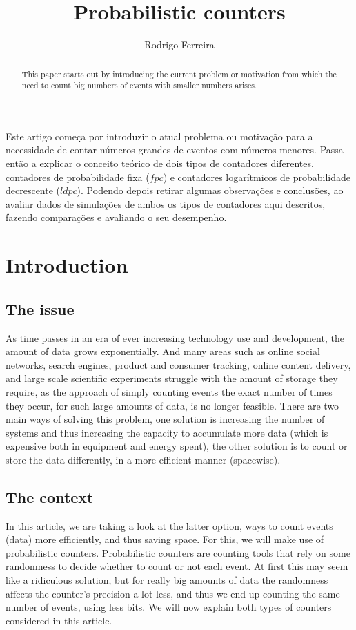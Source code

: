 \documentclass[...]{revdetua}
\begin{document}

\title{Probabilistic counters}
\author{Rodrigo Ferreira} %
\maketitle

\begin{resumo}%
	Este artigo começa por introduzir o  atual problema  ou motivação para a necessidade de contar números grandes de eventos com números menores.
	Passa então a explicar o conceito teórico de dois tipos de contadores diferentes, contadores de probabilidade fixa ($fpc$) e contadores logarítmicos de probabilidade decrescente ($ldpc$). 
	Podendo depois retirar algumas observações e conclusões, ao avaliar dados de simulações de ambos os tipos de contadores aqui descritos, fazendo comparações e avaliando o seu desempenho.
\end{resumo}

\begin{abstract}%
  This paper starts out by introducing the current problem or motivation from which the need to count big numbers of events with smaller numbers arises.
\end{abstract}
\section{Introduction}
\subsection{The issue}
As time passes in an era of ever increasing technology use and development, the amount of data grows exponentially. And many areas such as online social networks, search engines, product and consumer tracking, online content delivery, and  large scale scientific experiments struggle with the amount of storage they require, as the approach of simply counting events the exact number of times they occur, for such large amounts of data, is no longer feasible.
There are two main ways of solving this problem, one solution is increasing the number of systems and thus increasing the capacity to accumulate more data (which is expensive both in equipment and energy spent), the other solution is to count or store the data differently, in a more efficient  manner (spacewise).
\subsection{The context}
In this article, we are taking a look at the latter option, ways to count events (data) more efficiently, and thus saving space.
For this, we will make use of probabilistic counters.
Probabilistic counters are counting tools that rely on some randomness to decide whether to count  or not each event. At first this may seem like a ridiculous solution, but for really big amounts of data the randomness affects the counter's precision a lot less, and thus we end up counting the same number of events, using less bits.
We will now explain both types of counters considered in this article. 
\end{document}
